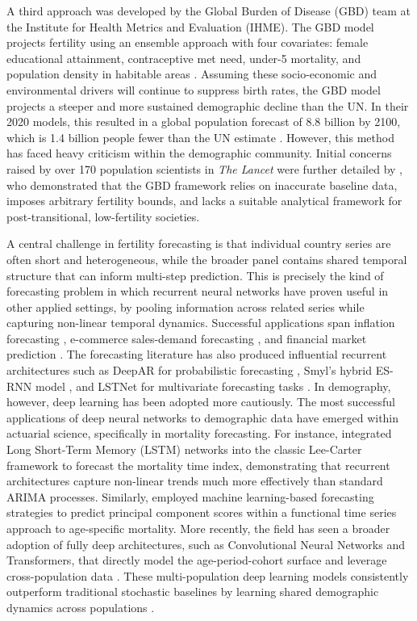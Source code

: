 \documentclass[12pt]{article}
\begin{document}
A third approach was developed by the Global Burden of Disease (GBD) team at the Institute for Health Metrics and Evaluation (IHME). The GBD model projects fertility using an ensemble approach with four covariates: female educational attainment, contraceptive met need, under-5 mortality, and population density in habitable areas \citep{gbd2024global}. Assuming these socio-economic and environmental drivers will continue to suppress birth rates, the GBD model projects a steeper and more sustained demographic decline than the UN. In their 2020 models, this resulted in a global population forecast of 8.8 billion by 2100, which is 1.4 billion people fewer than the UN estimate \citep{ihme2020, un2024wpp}. However, this method has faced heavy criticism within the demographic community. Initial concerns raised by over 170 population scientists in \textit{The Lancet} \citep{gietel2020letter} were further detailed by \cite{gietel2020uncertain}, who demonstrated that the GBD framework relies on inaccurate baseline data, imposes arbitrary fertility bounds, and lacks a suitable analytical framework for post-transitional, low-fertility societies.

A central challenge in fertility forecasting is that individual country series are often short and heterogeneous, while the broader panel contains shared temporal structure that can inform multi-step prediction. This is precisely the kind of forecasting problem in which recurrent neural networks have proven useful in other applied settings, by pooling information across related series while capturing non-linear temporal dynamics. Successful applications span inflation forecasting \citep{paranhos2025inflation}, e-commerce sales-demand forecasting \citep{bandara2019sales}, and financial market prediction \citep{fischer2018lstm}. The forecasting literature has also produced influential recurrent architectures such as DeepAR for probabilistic forecasting \citep{salinas2020deepar}, Smyl's hybrid ES-RNN model \citep{smyl2020hybrid}, and LSTNet for multivariate forecasting tasks \citep{lai2018modeling}. In demography, however, deep learning has been adopted more cautiously. The most successful applications of deep neural networks to demographic data have emerged within actuarial science, specifically in mortality forecasting. For instance, \citet{nigri2019deep} integrated Long Short-Term Memory (LSTM) networks into the classic Lee-Carter framework to forecast the mortality time index, demonstrating that recurrent architectures capture non-linear trends much more effectively than standard ARIMA processes. Similarly, \citet{beyaztas2022machine} employed machine learning-based forecasting strategies to predict principal component scores within a functional time series approach to age-specific mortality. More recently, the field has seen a broader adoption of fully deep architectures, such as Convolutional Neural Networks and Transformers, that directly model the age-period-cohort surface and leverage cross-population data \citep{zheng2025brief}. These multi-population deep learning models consistently outperform traditional stochastic baselines by learning shared demographic dynamics across populations \citep{park2025next}. 
\end{document}
